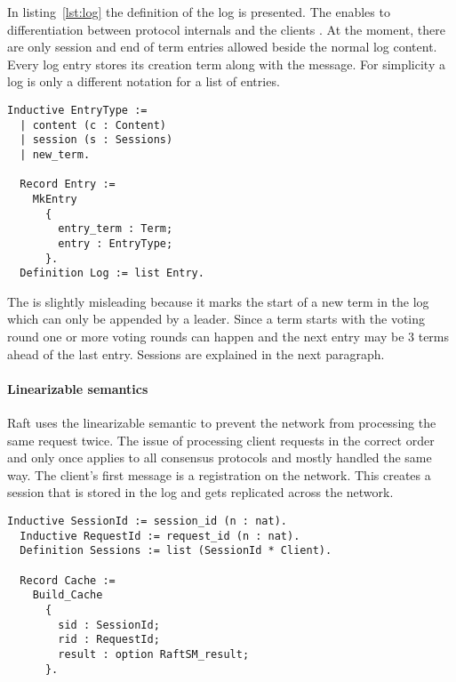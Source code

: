 In listing~\ref{lst:log} the definition of the log is presented. The
 enables to differentiation between protocol internals
and the clients . At the moment, there are only session and
end of term entries allowed beside the normal log content. Every log entry
stores its creation term along with the message. For simplicity a log 
is only a different notation for a list of entries.

\begin{lstlisting}[style=coq,label=lst:log,caption=The definition of raft log.]
  Inductive EntryType :=
  | content (c : Content)
  | session (s : Sessions)
  | new_term.

  Record Entry :=
    MkEntry
      {
        entry_term : Term;
        entry : EntryType;
      }.
  Definition Log := list Entry.
\end{lstlisting}

The  is slightly misleading because it marks the start of
a new term in the log which can only be appended by a leader. Since a
term starts with the voting round one or more voting rounds can happen
and the next entry may be 3 terms ahead of the last  entry.
Sessions are explained in the next paragraph.

\paragraph{Linearizable semantics}
Raft uses the linearizable semantic to prevent the network from
processing the same request twice. The issue of processing client
requests in the correct order and only once applies to all
consensus protocols and mostly handled the same way.
The client's first message is a registration on the network.
This creates a session that is stored in the log and gets
replicated across the network.

\begin{lstlisting}[style=coq,label=lst:linearizable,
caption=The definitions used to implement the linearizable semantics for raft.]
  Inductive SessionId := session_id (n : nat).
  Inductive RequestId := request_id (n : nat).
  Definition Sessions := list (SessionId * Client).

  Record Cache :=
    Build_Cache
      {
        sid : SessionId;
        rid : RequestId;
        result : option RaftSM_result;
      }.
\end{lstlisting}

